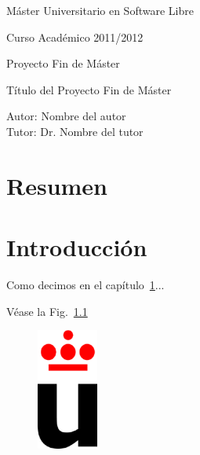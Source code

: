 \documentclass[a4paper, 12pt]{book}
\begin{document}
\begin{titlepage}
\begin{center}
\vspace{3cm}

\Large
Máster Universitario en Software Libre

\vspace{0.4cm}

\large
Curso Académico 2011/2012

\vspace{0.8cm}

Proyecto Fin de Máster

\vspace{2.5cm}

\LARGE
Título del Proyecto Fin de Máster

\vspace{4cm}

\large
Autor: Nombre del autor \\
Tutor: Dr. Nombre del tutor
\end{center}
\end{titlepage}

\tableofcontents  %

\listoffigures  %

\listoftables %


\chapter*{Resumen}
\label{chap:resumen}




\chapter{Introducci\'on}
\label{chap:intro}

Como decimos en el capítulo~\ref{chap:intro}...

Véase la Fig.~\ref{fig:logo}

\begin{figure}[H]
  \centering
  \includegraphics[width=2cm, keepaspectratio]{img/logo_vect.eps}
  \label{fig:logo}
\end{figure}
\end{document}
